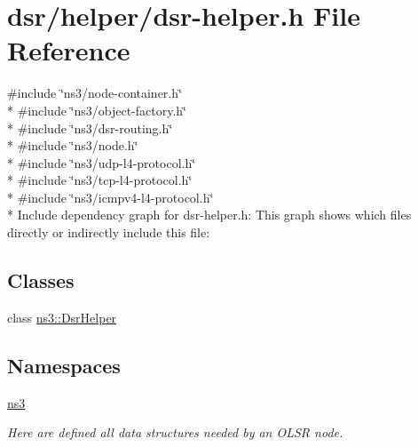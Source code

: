 \hypertarget{dsr-helper_8h}{}\section{dsr/helper/dsr-\/helper.h File Reference}
\label{dsr-helper_8h}
{\ttfamily \#include \char`\"{}ns3/node-\/container.\+h\char`\"{}}\\*
{\ttfamily \#include \char`\"{}ns3/object-\/factory.\+h\char`\"{}}\\*
{\ttfamily \#include \char`\"{}ns3/dsr-\/routing.\+h\char`\"{}}\\*
{\ttfamily \#include \char`\"{}ns3/node.\+h\char`\"{}}\\*
{\ttfamily \#include \char`\"{}ns3/udp-\/l4-\/protocol.\+h\char`\"{}}\\*
{\ttfamily \#include \char`\"{}ns3/tcp-\/l4-\/protocol.\+h\char`\"{}}\\*
{\ttfamily \#include \char`\"{}ns3/icmpv4-\/l4-\/protocol.\+h\char`\"{}}\\*
Include dependency graph for dsr-\/helper.h\+:
This graph shows which files directly or indirectly include this file\+:
\subsection*{Classes}
\begin{DoxyCompactItemize}
\item 
class \hyperlink{classns3_1_1DsrHelper}{ns3\+::\+Dsr\+Helper}
\end{DoxyCompactItemize}
\subsection*{Namespaces}
\begin{DoxyCompactItemize}
\item 
 \hyperlink{namespacens3}{ns3}
\begin{DoxyCompactList}\small\item\em Here are defined all data structures needed by an O\+L\+SR node. \end{DoxyCompactList}\end{DoxyCompactItemize}
